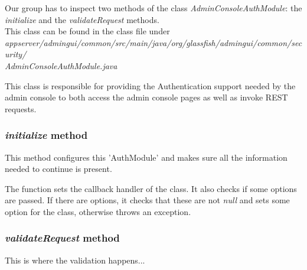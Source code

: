 Our group has to inspect two methods of the class \textit{AdminConsoleAuthModule}: the \textit{initialize} and the \textit{validateRequest} methods.\\
This class can be found in the class file under \textit{appserver/admingui/common/src/main/java/org/glassfish/admingui/common/security/\\AdminConsoleAuthModule.java}

This class is responsible for providing the Authentication support needed by the admin console to both access the admin console pages as well as invoke REST requests.

\subsubsection{\textit{initialize} method}
This method configures this 'AuthModule' and makes sure all the information needed to continue is present.

The function sets the callback handler of the class.
It also checks if some options are passed. If there are options, it checks that these are not \textit{null} and sets some option for the class, otherwise throws an exception.


\subsubsection{\textit{validateRequest} method}
This is where the validation happens...